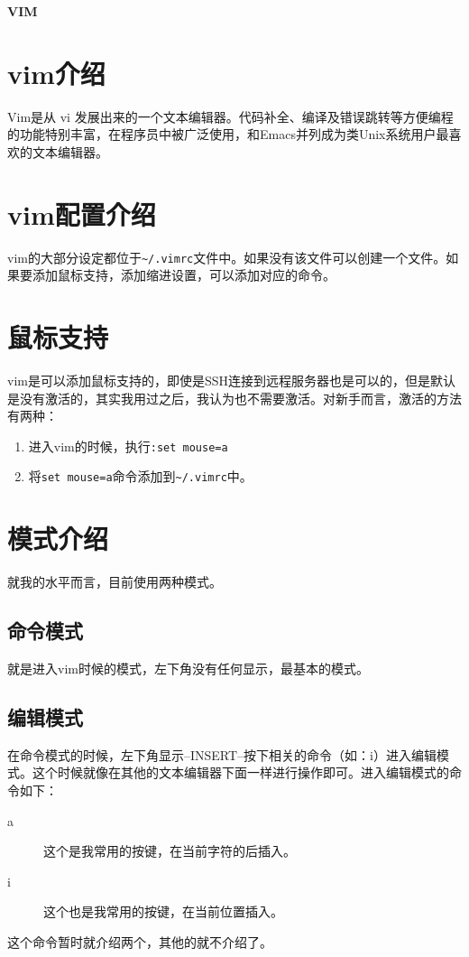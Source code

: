 \documentclass[a4paper,12pt]{ctexart}%
\begin{document}
\pagestyle{empty}
\begin{center}
\huge \textbf{VIM}
\end{center}

\newpage
\tableofcontents

\newpage
\section{vim介绍}
Vim是从 vi 发展出来的一个文本编辑器。代码补全、编译及错误跳转等方便编程的功能特别丰富，在程序员中被广泛使用，和Emacs并列成为类Unix系统用户最喜欢的文本编辑器。

\section{vim配置介绍}
vim的大部分设定都位于\verb|~/.vimrc|文件中。如果没有该文件可以创建一个文件。如果要添加鼠标支持，添加缩进设置，可以添加对应的命令。

\section{鼠标支持}
vim是可以添加鼠标支持的，即使是SSH连接到远程服务器也是可以的，但是默认是没有激活的，其实我用过之后，我认为也不需要激活。对新手而言，激活的方法有两种：
\begin{enumerate}
  \item 进入vim的时候，执行\verb|:set mouse=a|
  \item 将\verb|set mouse=a|命令添加到\verb|~/.vimrc|中。
\end{enumerate}

\section{模式介绍}
就我的水平而言，目前使用两种模式。
\subsection{命令模式}
就是进入vim时候的模式，左下角没有任何显示，最基本的模式。
\subsection{编辑模式}
在命令模式的时候，左下角显示--INSERT--按下相关的命令（如：i）进入编辑模式。这个时候就像在其他的文本编辑器下面一样进行操作即可。进入编辑模式的命令如下：
\begin{description}
  \item[a] 这个是我常用的按键，在当前字符的后插入。
  \item[i] 这个也是我常用的按键，在当前位置插入。
\end{description}
这个命令暂时就介绍两个，其他的就不介绍了。
\end{document}
